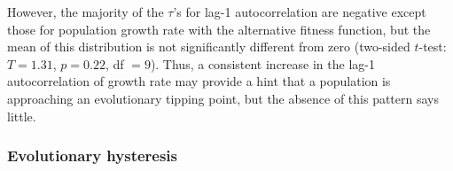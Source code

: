 \documentclass[12pt,letterpaper]{article} %
\begin{document}
However, the majority of the $\tau$'s for lag-1 autocorrelation are negative except those for population growth rate with the alternative fitness function, but the mean of this distribution is not significantly different from zero (two-sided $t$-test: $T = 1.31$, $p = 0.22$, df $= 9$).
Thus, a consistent increase in the lag-1 autocorrelation of growth rate may provide a hint that a population is approaching an evolutionary tipping point, but the absence of this pattern says little. 

\subsubsection*{Evolutionary hysteresis}
\end{document}

